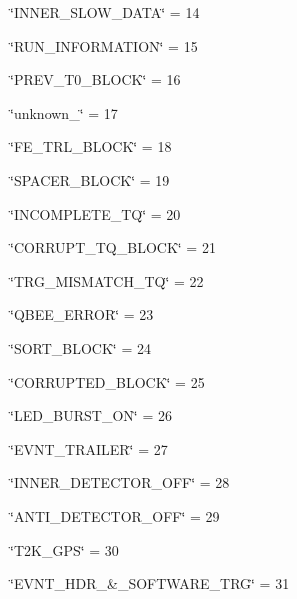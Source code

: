 \begin{DoxyItemize}
\item \char`\"{}\+INNER\+\_\+\+SLOW\+\_\+\+DATA\char`\"{} = 14
\item \char`\"{}\+RUN\+\_\+\+INFORMATION\char`\"{} = 15
\item \char`\"{}\+PREV\+\_\+\+T0\+\_\+\+BLOCK\char`\"{} = 16
\item \char`\"{}unknown\+\_\char`\"{} = 17
\item \char`\"{}\+FE\+\_\+\+TRL\+\_\+\+BLOCK\char`\"{} = 18
\item \char`\"{}\+SPACER\+\_\+\+BLOCK\char`\"{} = 19
\item \char`\"{}\+INCOMPLETE\+\_\+\+TQ\char`\"{} = 20
\item \char`\"{}\+CORRUPT\+\_\+\+TQ\+\_\+\+BLOCK\char`\"{} = 21
\item \char`\"{}\+TRG\+\_\+\+MISMATCH\+\_\+\+TQ\char`\"{} = 22
\item \char`\"{}\+QBEE\+\_\+\+ERROR\char`\"{} = 23
\item \char`\"{}\+SORT\+\_\+\+BLOCK\char`\"{} = 24
\item \char`\"{}\+CORRUPTED\+\_\+\+BLOCK\char`\"{} = 25
\item \char`\"{}\+LED\+\_\+\+BURST\+\_\+\+ON\char`\"{} = 26
\item \char`\"{}\+EVNT\+\_\+\+TRAILER\char`\"{} = 27
\item \char`\"{}\+INNER\+\_\+\+DETECTOR\+\_\+\+OFF\char`\"{} = 28
\item \char`\"{}\+ANTI\+\_\+\+DETECTOR\+\_\+\+OFF\char`\"{} = 29
\item \char`\"{}\+T2\+K\+\_\+\+GPS\char`\"{} = 30
\item \char`\"{}\+EVNT\+\_\+\+HDR\+\_\+\&\+\_\+\+SOFTWARE\+\_\+\+TRG\char`\"{} = 31 
\end{DoxyItemize}